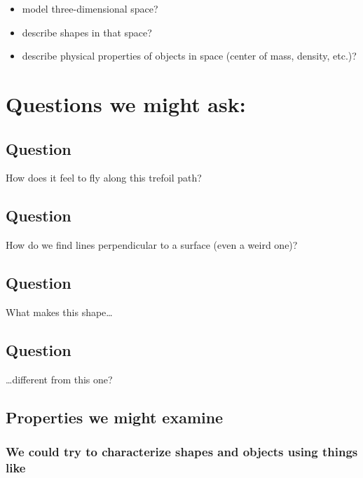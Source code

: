 \documentclass[]{article}
\begin{document}
\begin{itemize}
\itemsep1pt\parskip0pt
\item
  model three-dimensional space?
\item
  describe shapes in that space?
\item
  describe physical properties of objects in space (center of mass,
  density, etc.)?
\end{itemize}

\section{Questions we might ask:}\label{questions-we-might-ask}

\subsection{Question}\label{question}

How does it feel to fly along this trefoil path?

\subsection{Question}\label{question-1}

How do we find lines perpendicular to a surface (even a weird one)?

\subsection{Question}\label{question-2}

What makes this shape\ldots{}

\subsection{Question}\label{question-3}

\ldots{}different from this one?

\subsection{Properties we might
examine}\label{properties-we-might-examine}

\subsubsection{We could try to characterize shapes and objects using
things
like}\label{we-could-try-to-characterize-shapes-and-objects-using-things-like}
\end{document}

